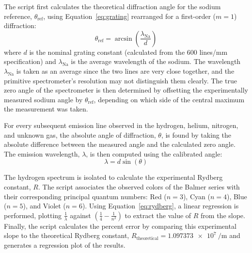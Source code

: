 \documentclass[11pt]{article}
\begin{document}
        The script first calculates the theoretical diffraction angle for the
        sodium reference, \( \theta_{\text{ref}} \), using
        Equation~\ref{eq:grating} rearranged for a first-order (\( m = 1 \))
        diffraction:
        \[
            \theta_{\text{ref}} = \arcsin\left( \frac{\lambda_{\text{Na}}}{d} \right)
        \]
        where \( d \) is the nominal grating constant (calculated from the 600
        lines/mm specification) and \( \lambda_{\text{Na}} \) is the average
        wavelength of the sodium.
        The wavelength \( \lambda_{\text{Na}} \) is taken as an average since
        the two lines are very close together, and the primitive
        spectrometer's resolution may not distinguish them clearly.
        The true zero angle of the spectrometer is then determined by
        offsetting the experimentally measured sodium angle by
        \( \theta_{\text{ref}}\), depending on which side of the central
        maximum the measurement was taken.

        For every subsequent emission line observed in the hydrogen, helium,
        nitrogen, and unknown gas, the absolute angle of diffraction,
        \( \theta \), is found by taking the absolute difference between the
        measured angle and the calculated zero angle.
        The emission wavelength, \( \lambda \), is then computed using the
        calibrated angle:
        \[
            \lambda = d \sin(\theta)
        \]

        The hydrogen spectrum is isolated to calculate the
        experimental Rydberg constant, \( R \).
        The script associates the observed colors of the Balmer series with
        their corresponding principal quantum numbers: Red (\( n=3 \)), Cyan
        (\( n=4 \)), Blue (\( n=5 \)), and Violet (\( n=6 \)).
        Using Equation~\ref{eq:rydberg}, a linear regression is performed,
        plotting \( \frac{1}{\lambda} \) against
        \( \left( \frac{1}{4} - \frac{1}{n^2} \right) \) to extract the value
        of \( R \) from the slope.
        Finally, the script calculates the percent error by comparing this
        experimental slope to the theoretical Rydberg constant,
        \( R_{\text{theoretical}} = \SI{1.097373e7}{\per\meter} \) and
        generates a regression plot of the results.

        
\end{document}
